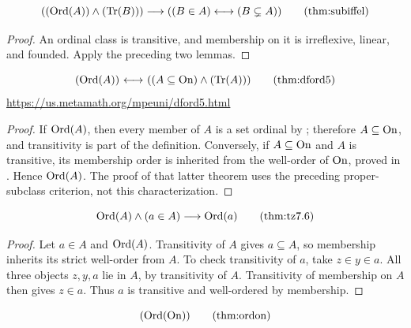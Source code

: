 \begin{theorem}
\[
(
(\Ord(A))\land
(\Tr(B))
)
\implies
(
(B\in A)
\iffnows
(B\subsetneq A)
)
\labeltagd{thm}{subiffel}
\]
\end{theorem}
\begin{proof}
An ordinal class is transitive, and membership on it is irreflexive,
linear, and founded. Apply the preceding two lemmas.
\end{proof}
\begin{theorem}
\[
(
\Ord(A)
)
\iff
(
(A\subclass\On)
\land
(\Tr(A))
)
\clabeltagd{thm}{dford5}
\]
\url{https://us.metamath.org/mpeuni/dford5.html}
\end{theorem}
\begin{proof}
If $\mathrm{Ord}(A)$, then every member of $A$ is a set ordinal by
; therefore $A\subseteq\mathrm{On}$, and transitivity is part
of the definition. Conversely, if $A\subseteq\mathrm{On}$ and $A$ is transitive,
its membership order is inherited from the well-order of $\mathrm{On}$, proved
in . Hence $\mathrm{Ord}(A)$. The proof of that latter theorem
uses the preceding proper-subclass criterion, not this characterization.
\end{proof}
\begin{theorem}
\[
\Ord(A)\land(a\in A)\implies \Ord(a)
\clabeltagd{thm}{tz7.6}
\]%
\end{theorem}
\begin{proof}
Let $a\in A$ and $\mathrm{Ord}(A)$. Transitivity of $A$ gives $a\subseteq A$,
so membership inherits its strict well-order from $A$. To check
transitivity of $a$, take $z\in y\in a$. All three objects $z,y,a$
lie in $A$, by transitivity of $A$. Transitivity of membership on $A$
then gives $z\in a$. Thus $a$ is transitive and well-ordered by membership.
\end{proof}
\begin{theorem}
\[
(
\Ord(\On)
)
\labeltagd{thm}{ordon}
\]
\end{theorem}
